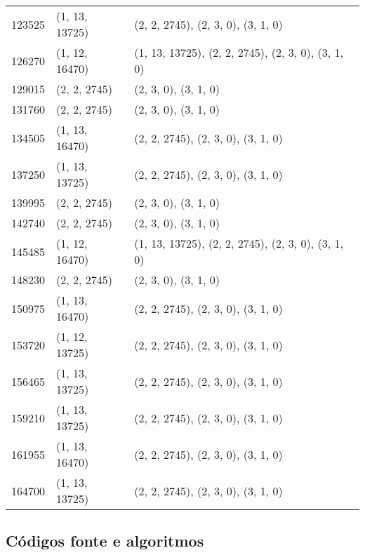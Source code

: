 \begin{longtable}{@{\extracolsep{\fill}}lll}
	123525             & (1, 13, 13725)              & (2, 2, 2745), (2, 3, 0), (3, 1, 0)                  \\
	126270             & (1, 12, 16470)              & (1, 13, 13725), (2, 2, 2745), (2, 3, 0), (3, 1, 0)  \\
	129015             & (2, 2, 2745)                & (2, 3, 0), (3, 1, 0)                                \\
	131760             & (2, 2, 2745)                & (2, 3, 0), (3, 1, 0)                                \\
	134505             & (1, 13, 16470)              & (2, 2, 2745), (2, 3, 0), (3, 1, 0)                  \\
	137250             & (1, 13, 13725)              & (2, 2, 2745), (2, 3, 0), (3, 1, 0)                  \\
	139995             & (2, 2, 2745)                & (2, 3, 0), (3, 1, 0)                                \\
	142740             & (2, 2, 2745)                & (2, 3, 0), (3, 1, 0)                                \\
	145485             & (1, 12, 16470)              & (1, 13, 13725), (2, 2, 2745), (2, 3, 0), (3, 1, 0)  \\
	148230             & (2, 2, 2745)                & (2, 3, 0), (3, 1, 0)                                \\
	150975             & (1, 13, 16470)              & (2, 2, 2745), (2, 3, 0), (3, 1, 0)                  \\
	153720             & (1, 12, 13725)              & (2, 2, 2745), (2, 3, 0), (3, 1, 0)                  \\
	156465             & (1, 13, 13725)              & (2, 2, 2745), (2, 3, 0), (3, 1, 0)                  \\
	159210             & (1, 13, 13725)              & (2, 2, 2745), (2, 3, 0), (3, 1, 0)                  \\
	161955             & (1, 13, 16470)              & (2, 2, 2745), (2, 3, 0), (3, 1, 0)                  \\
	164700             & (1, 13, 13725)              & (2, 2, 2745), (2, 3, 0), (3, 1, 0)                  \\
\end{longtable}


\subsection{Códigos fonte e algoritmos}\label{subsec:algoritimos}

